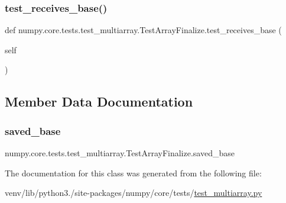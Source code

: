 \subsubsection{\texorpdfstring{test\+\_\+receives\+\_\+base()}{test\_receives\_base()}}
{\footnotesize\ttfamily def numpy.\+core.\+tests.\+test\+\_\+multiarray.\+Test\+Array\+Finalize.\+test\+\_\+receives\+\_\+base (\begin{DoxyParamCaption}\item[{}]{self }\end{DoxyParamCaption})}



\subsection{Member Data Documentation}
\mbox{\label{classnumpy_1_1core_1_1tests_1_1test__multiarray_1_1TestArrayFinalize_ad332660c94e0dc445428b13c6a5ca273}} 
\subsubsection{\texorpdfstring{saved\+\_\+base}{saved\_base}}
{\footnotesize\ttfamily numpy.\+core.\+tests.\+test\+\_\+multiarray.\+Test\+Array\+Finalize.\+saved\+\_\+base}



The documentation for this class was generated from the following file\+:\begin{DoxyCompactItemize}
\item 
venv/lib/python3./site-\/packages/numpy/core/tests/\hyperlink{core_2tests_2test__multiarray_8py}{test\+\_\+multiarray.\+py}\end{DoxyCompactItemize}
